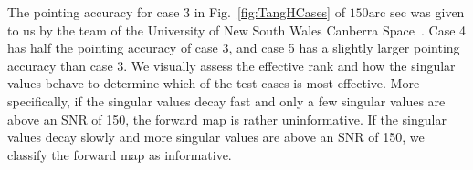 The pointing accuracy for case 3 in Fig.~\ref{fig:TangHCases} of $150\text{arc sec}$ was given to us by the team of the University of New South Wales Canberra Space~\cite{CubeSatInternal}.
Case 4 has half the pointing accuracy of case 3, and case 5 has a slightly larger pointing accuracy than case 3.
We visually assess the effective rank and how the singular values behave to determine which of the test cases is most effective.
More specifically, if the singular values decay fast and only a few singular values are above an SNR of 150, the forward map is rather uninformative.
If the singular values decay slowly and more singular values are above an SNR of 150, we classify the forward map as informative.

